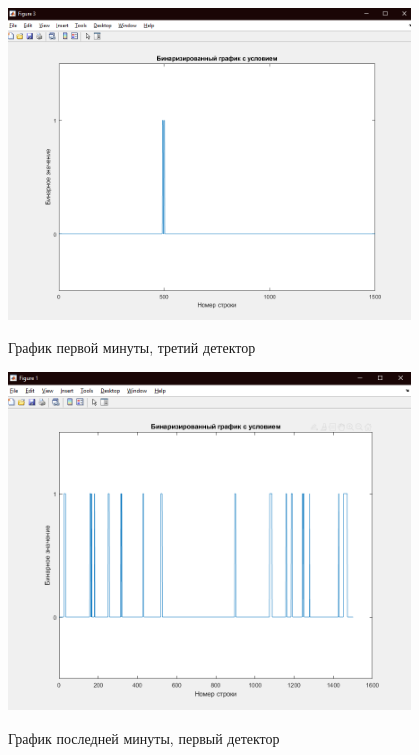 \documentclass[a4paper,12pt]{article}
\begin{document}
\begin{center}
\includegraphics[width=0.8\textwidth]{images/binary/binary_first_3.png}
\end{center}
\begin{center}
График первой минуты, третий детектор
\end{center}

\begin{center}
\includegraphics[width=0.8\textwidth]{images/binary/binary_last_1.png}
\end{center}
\begin{center}
График последней минуты, первый детектор
\end{center}
\end{document}
